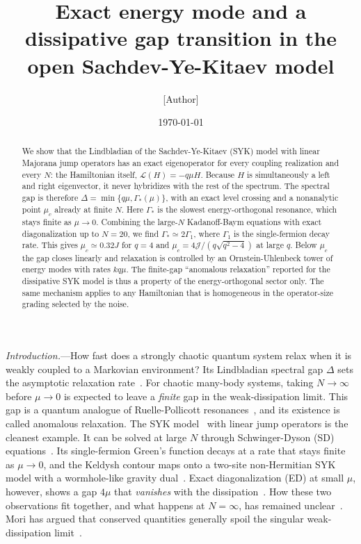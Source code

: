 \documentclass[aps,prl,twocolumn,superscriptaddress,amsmath,amssymb,10pt]{revtex4-2}
\newcommand{\Lc}{\mathcal{L}}
\newcommand{\J}{\mathcal{J}}
\begin{document}
\title{Exact energy mode and a dissipative gap transition in the open Sachdev-Ye-Kitaev model}

\author{[Author]}
\affiliation{[Affiliation]}

\date{\today}

\begin{abstract}
We show that the Lindbladian of the Sachdev-Ye-Kitaev (SYK) model with linear Majorana jump operators has an exact eigenoperator for every coupling realization and every $N$: the Hamiltonian itself, $\Lc(H)=-q\mu H$. Because $H$ is simultaneously a left and right eigenvector, it never hybridizes with the rest of the spectrum. The spectral gap is therefore $\Delta=\min\{q\mu,\Gamma_\ast(\mu)\}$, with an exact level crossing and a nonanalytic point $\mu_c$ already at finite $N$. Here $\Gamma_\ast$ is the slowest energy-orthogonal resonance, which stays finite as $\mu\to0$. Combining the large-$N$ Kadanoff-Baym equations with exact diagonalization up to $N=20$, we find $\Gamma_\ast\simeq 2\Gamma_1$, where $\Gamma_1$ is the single-fermion decay rate. This gives $\mu_c\simeq0.32J$ for $q=4$ and $\mu_c=4\J/(q\sqrt{q^2-4})$ at large $q$. Below $\mu_c$ the gap closes linearly and relaxation is controlled by an Ornstein-Uhlenbeck tower of energy modes with rates $kq\mu$. The finite-gap ``anomalous relaxation'' reported for the dissipative SYK model is thus a property of the energy-orthogonal sector only. The same mechanism applies to any Hamiltonian that is homogeneous in the operator-size grading selected by the noise.
\end{abstract}

\maketitle

\emph{Introduction.}---How fast does a strongly chaotic quantum system relax when it is weakly coupled to a Markovian environment? Its Lindbladian spectral gap $\Delta$ sets the asymptotic relaxation rate~\cite{Kessler2012,Minganti2018,Znidaric2015}. For chaotic many-body systems, taking $N\to\infty$ before $\mu\to0$ is expected to leave a \emph{finite} gap in the weak-dissipation limit. This gap is a quantum analogue of Ruelle-Pollicott resonances~\cite{Prosen2002,Mori2024,Jacoby2025,Zhang2026}, and its existence is called anomalous relaxation. The SYK model~\cite{SY1993,Kitaev2015,MS2016} with linear jump operators is the cleanest example. It can be solved at large $N$ through Schwinger-Dyson (SD) equations~\cite{Kulkarni2022,Sa2022,Garcia2023}. Its single-fermion Green's function decays at a rate that stays finite as $\mu\to0$, and the Keldysh contour maps onto a two-site non-Hermitian SYK model with a wormhole-like gravity dual~\cite{Garcia2023,MQ2018}. Exact diagonalization (ED) at small $\mu$, however, shows a gap $4\mu$ that \emph{vanishes} with the dissipation~\cite{Garcia2023}. How these two observations fit together, and what happens at $N=\infty$, has remained unclear~\cite{Garcia2023,Zheng2026}. Mori has argued that conserved quantities generally spoil the singular weak-dissipation limit~\cite{Mori2024}.
\end{document}
